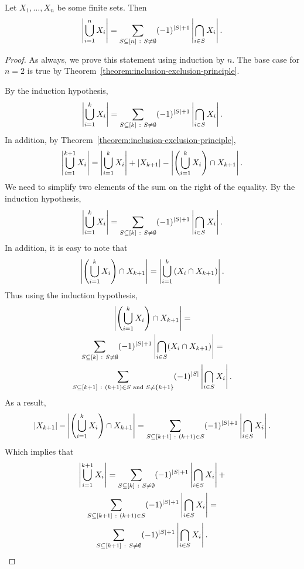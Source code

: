 \begin{corollary}
\label{corollary:inclusion-exclusion-principle}
  Let $X_1, \dots, X_n$ be some finite sets. Then
  \[
    \left|{\bigcup_{i = 1}^n X_i}\right| =
    \sum_{S \subseteq {[{n}]} ~:~ S \neq \emptyset} 
      (-1)^{\left|{S}\right| + 1} \left|{\bigcap_{i \in S} X_i}\right|.
  \]
\end{corollary}
\begin{proof}
  As always, we prove this statement using induction by $n$. The base case for
  $n = 2$ is true by Theorem~\ref{theorem:inclusion-exclusion-principle}.

  By the induction hypothesis,
  \[
    \left|{\bigcup_{i = 1}^k X_i}\right| =
    \sum_{S \subseteq {[{k}]} ~:~ S \neq \emptyset} 
      (-1)^{\left|{S}\right| + 1} \left|{\bigcap_{i \in S} X_i}\right|.
  \]
  In addition, by Theorem~\ref{theorem:inclusion-exclusion-principle},
  \[
    \left|{\bigcup_{i = 1}^{k + 1} X_i}\right| =
    \left|{\bigcup_{i = 1}^k X_i}\right| + \left|{X_{k + 1}}\right| -
      \left|{\left(\bigcup_{i = 1}^k X_i\right) \cap X_{k + 1}}\right|.
  \]
  We need to simplify two elements of the sum on the right of the equality.
  By the induction hypothesis,
  \[
    \left|{\bigcup_{i = 1}^k X_i}\right| =
    \sum_{S \subseteq {[{k}]} ~:~ S \neq \emptyset}
        (-1)^{\left|{S}\right| + 1} \left|{\bigcap_{i \in S} X_i}\right|.
  \]
  In addition, it is easy to note that
  \[
    \left|{\left(\bigcup_{i = 1}^k X_i\right) \cap X_{k + 1}}\right| =
    \left|{\bigcup_{i = 1}^k \left(X_i \cap X_{k + 1}\right)}\right|.
  \]
  Thus using the induction hypothesis,
  \begin{multline*}
    \cardinality{\left(\bigcup_{i = 1}^k X_i\right) \cap X_{k + 1}} = \\
    \sum_{S \subseteq \range{k} ~:~ S \neq \emptyset}
      (-1)^{\cardinality{S} + 1} \cardinality{\bigcap_{i \in S} (X_i \cap X_{k + 1})} = \\
    \sum_{S \subseteq \range{k + 1} ~:~ (k + 1) \in S \text{ and } S \neq \set{k + 1}}
          (-1)^{\cardinality{S}} \cardinality{\bigcap_{i \in S} X_i}.
  \end{multline*}
  As a result,
  \[
    \left|{X_{k + 1}}\right| -
      \left|{\left(\bigcup_{i = 1}^k X_i\right) \cap X_{k + 1}}\right| =
    \sum_{S \subseteq {[{k + 1}]} ~:~ (k + 1) \in S}
          (-1)^{\left|{S}\right| + 1} \left|{\bigcap_{i \in S} X_i}\right|.
  \]
  Which implies that
  \begin{multline*}
    \left|{\bigcup_{i = 1}^{k + 1} X_i}\right| =
    \sum_{S \subseteq {[{k}]} ~:~ S \neq \emptyset}
      (-1)^{\left|{S}\right| + 1}\left|{\bigcap_{i \in S} X_i}\right| + \\
    \sum_{S \subseteq {[{k + 1}]} ~:~ (k + 1) \in S}
          (-1)^{\left|{S}\right| + 1} \left|{\bigcap_{i \in S} X_i}\right| = \\
    \sum_{S \subseteq {[{k + 1}]} ~:~ S \neq \emptyset}
      (-1)^{\left|{S}\right| + 1} \left|{\bigcap_{i \in S} X_i}\right|.
  \end{multline*}
\end{proof}



